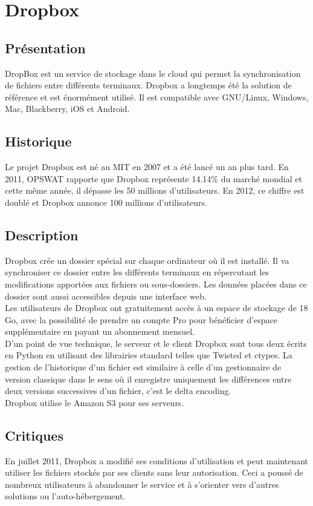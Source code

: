 \section{Dropbox}
\thispagestyle{EIP} %
\subsection{Présentation}
DropBox est un service de stockage dans le cloud qui permet la synchronisation de fichiers entre différents terminaux. Dropbox a longtemps été la solution de référence et est énormément utilisé. Il est compatible avec GNU/Linux, Windows, Mac, Blackberry, iOS et Android.\\

\subsection{Historique}
Le projet Dropbox est né au MIT en 2007 et a été lancé un an plus tard. En 2011, OPSWAT rapporte que Dropbox représente 14.14\% du marché mondial et cette même année, il dépasse les 50 millions d'utilisateurs. En 2012, ce chiffre est doublé et Dropbox annonce 100 millions d'utilisateurs.\\

\subsection{Description}
Dropbox crée un dossier spécial sur chaque ordinateur où il est installé. Il va synchroniser ce dossier entre les différents terminaux en répercutant les modifications apportées aux fichiers ou sous-dossiers. Les données placées dans ce dossier sont aussi accessibles depuis une interface web.\\

Les utilisateurs de Dropbox ont gratuitement accès à un espace de stockage de 18 Go, avec la possibilité de prendre un compte Pro pour bénéficier d'espace supplémentaire en payant un abonnement mensuel.\\

D'un point de vue technique, le serveur et le client Dropbox sont tous deux écrits en Python en utilisant des librairies standard telles que Twisted et ctypes. La gestion de l'historique d'un fichier est similaire à celle d'un gestionnaire de version classique dans le sens où il enregistre uniquement les différences entre deux versions successives d'un fichier, c'est le delta encoding.\\

Dropbox utilise le Amazon S3 pour ses serveurs.\\

\subsection{Critiques}

En juillet 2011, Dropbox a modifié ses conditions d'utilisation et peut maintenant utiliser les fichiers stockés par ses clients sans leur autorisation. Ceci a poussé de nombreux utilisateurs à abandonner le service et à s'orienter vers d'autres solutions ou l'auto-hébergement.\\
